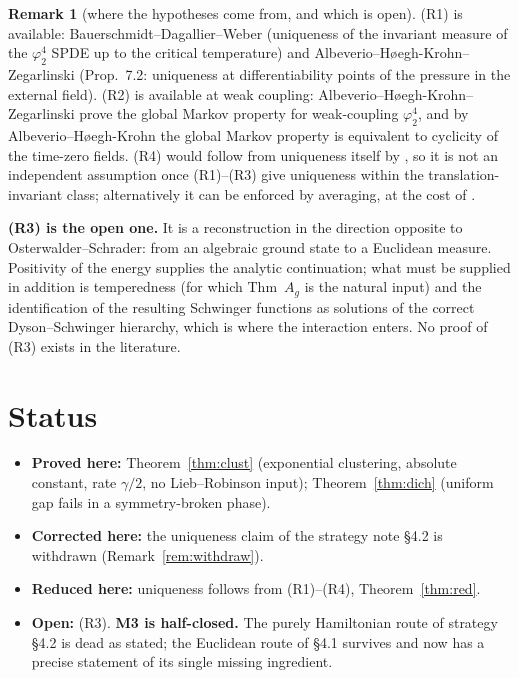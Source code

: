\documentclass[11pt,a4paper]{article}
\theoremstyle{plain}
\theoremstyle{definition}
\newtheorem{remark}[theorem]{Remark}
\begin{document}
\begin{remark}[where the hypotheses come from, and which is open]\label{rem:status}
(R1) is available: Bauerschmidt--Dagallier--Weber (uniqueness of the invariant measure of the
$\varphi^4_2$ SPDE up to the critical temperature) and Albeverio--H\o egh-Krohn--Zegarlinski
(Prop.~7.2: uniqueness at differentiability points of the pressure in the external field).
(R2) is available at weak coupling: Albeverio--H\o egh-Krohn--Zegarlinski prove the global Markov
property for weak-coupling $\varphi^4_2$, and by Albeverio--H\o egh-Krohn the global Markov
property is equivalent to cyclicity of the time-zero fields.
(R4) would follow from uniqueness itself by \cite[Cor.~2.3]{M0}, so it is not an independent
assumption once (R1)--(R3) give uniqueness within the translation-invariant class; alternatively it
can be enforced by averaging, at the cost of \cite[Rem.~3.4]{M0}.

\textbf{(R3) is the open one.} It is a reconstruction in the direction opposite to
Osterwalder--Schrader: from an algebraic ground state to a Euclidean measure. Positivity of the
energy supplies the analytic continuation; what must be supplied in addition is temperedness
(for which \cite{GJIV} Thm~$A_g$ is the natural input) and the identification of the resulting
Schwinger functions as solutions of the correct Dyson--Schwinger hierarchy, which is where the
interaction enters. No proof of (R3) exists in the literature.
\end{remark}

\section{Status}

\begin{itemize}
\item \textbf{Proved here:} Theorem~\ref{thm:clust} (exponential clustering, absolute constant,
      rate $\gamma/2$, no Lieb--Robinson input); Theorem~\ref{thm:dich} (uniform gap fails in a
      symmetry-broken phase).
\item \textbf{Corrected here:} the uniqueness claim of the strategy note \S4.2 is withdrawn
      (Remark~\ref{rem:withdraw}).
\item \textbf{Reduced here:} uniqueness follows from (R1)--(R4), Theorem~\ref{thm:red}.
\item \textbf{Open:} (R3). \textbf{M3 is half-closed.} The purely Hamiltonian route of strategy
      \S4.2 is dead as stated; the Euclidean route of \S4.1 survives and now has a precise
      statement of its single missing ingredient.
\end{itemize}
\end{document}
